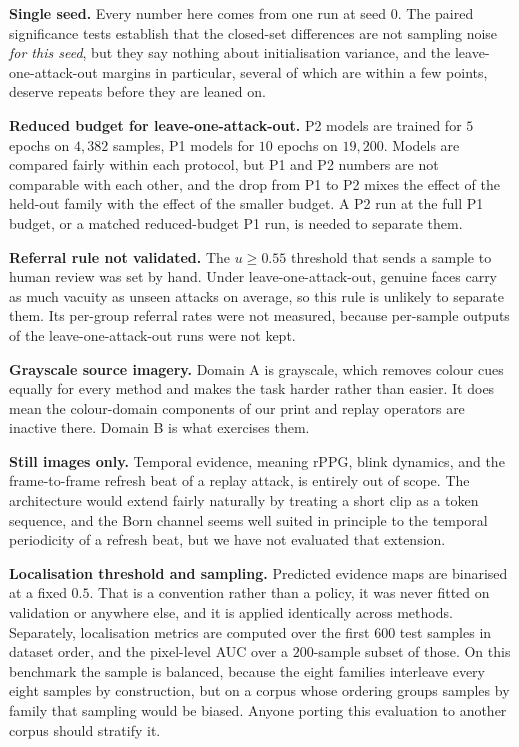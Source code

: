 \documentclass[conference]{IEEEtran}
\begin{document}
\textbf{Single seed.} Every number here comes from one run at seed $0$. The paired
significance tests establish that the closed-set differences are not sampling noise
\emph{for this seed}, but they say nothing about initialisation variance, and the
leave-one-attack-out margins in particular, several of which are within a few points,
deserve repeats before they are leaned on.

\textbf{Reduced budget for leave-one-attack-out.} P2 models are trained for $5$
epochs on $4{,}382$ samples, P1 models for $10$ epochs on $19{,}200$. Models are
compared fairly within each protocol, but P1 and P2 numbers are not comparable with
each other, and the drop from P1 to P2 mixes the effect of the held-out family with
the effect of the smaller budget. A P2 run at the full P1 budget, or a matched
reduced-budget P1 run, is needed to separate them.

\textbf{Referral rule not validated.} The $u\ge0.55$ threshold that sends a sample
to human review was set by hand. Under leave-one-attack-out, genuine faces carry
as much vacuity as unseen attacks on average, so this rule is unlikely to separate
them. Its per-group referral rates were not measured, because per-sample outputs of
the leave-one-attack-out runs were not kept.

\textbf{Grayscale source imagery.} Domain A is grayscale, which removes colour cues
equally for every method and makes the task harder rather than easier. It does mean
the colour-domain components of our print and replay operators are inactive there.
Domain B is what exercises them.

\textbf{Still images only.} Temporal evidence, meaning rPPG, blink dynamics, and the
frame-to-frame refresh beat of a replay attack, is entirely out of scope. The
architecture would extend fairly naturally by treating a short clip as a token
sequence, and the Born channel seems well suited in principle to the temporal
periodicity of a refresh beat, but we have not evaluated that extension.

\textbf{Localisation threshold and sampling.} Predicted evidence maps are binarised
at a fixed $0.5$. That is a convention rather than a policy, it was never fitted on
validation or anywhere else, and it is applied identically across methods.
Separately, localisation metrics are computed over the first $600$ test samples in
dataset order, and the pixel-level AUC over a $200$-sample subset of those. On this
benchmark the sample is balanced, because the eight families interleave every eight
samples by construction, but on a corpus whose ordering groups samples by family that
sampling would be biased. Anyone porting this evaluation to another corpus should
stratify it.
\end{document}
